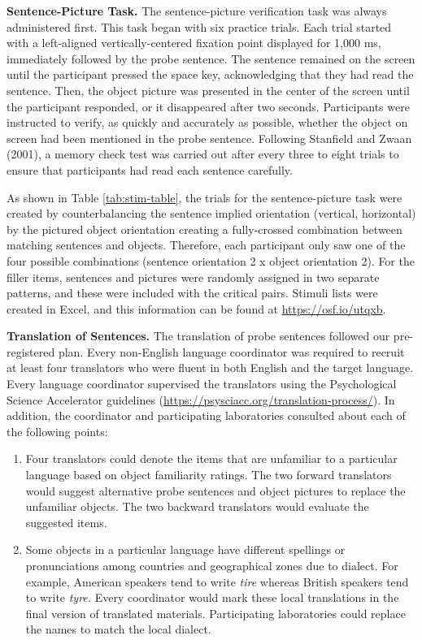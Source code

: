 \documentclass[
  man,floatsintext]{apa7}
\begin{document}
\textbf{Sentence-Picture Task.} The sentence-picture verification task was
always administered first. This task began with six practice trials.
Each trial started with a left-aligned vertically-centered fixation
point displayed for 1,000 ms, immediately followed by the probe
sentence. The sentence remained on the screen until the participant
pressed the space key, acknowledging that they had read the sentence.
Then, the object picture was
presented in the center of the screen until the participant responded,
or it disappeared after two seconds. Participants were instructed to
verify, as quickly and accurately as possible, whether the object on
screen had been mentioned in the probe sentence. Following
Stanfield and Zwaan (2001), a memory check test was carried out after every
three to eight trials to ensure that participants had read each sentence
carefully.

As shown in Table \ref{tab:stim-table}, the trials for the
sentence-picture task were created by counterbalancing the sentence
implied orientation (vertical, horizontal) by the pictured object
orientation creating a fully-crossed combination between matching
sentences and objects. Therefore, each participant only saw one of the
four possible combinations (sentence orientation 2 x object orientation
2). For the filler items, sentences and pictures were randomly assigned
in two separate patterns, and these were included with the critical
pairs. Stimuli lists were created in Excel, and this information can be
found at \url{https://osf.io/utqxb}.

\textbf{Translation of Sentences.} The translation of probe sentences
followed our pre-registered plan. Every non-English language coordinator
was required to recruit at least four translators who were fluent in
both English and the target language. Every language coordinator
supervised the translators using the Psychological Science Accelerator
guidelines (\url{https://psysciacc.org/translation-process/}). In addition,
the coordinator and participating laboratories consulted about each of
the following points:

\begin{enumerate}
\def\labelenumi{\arabic{enumi})}
\item
  Four translators could denote the items that are unfamiliar to a
  particular language based on object familiarity ratings. The two
  forward translators would suggest alternative probe sentences and
  object pictures to replace the unfamiliar objects. The two backward
  translators would evaluate the suggested items.
\item
  Some objects in a particular language have different spellings or
  pronunciations among countries and geographical zones due to
  dialect. For example, American speakers tend to write \emph{tire} whereas
  British speakers tend to write \emph{tyre.} Every coordinator would mark
  these local translations in the final version of translated
  materials. Participating laboratories could replace the names to
  match the local dialect.
\end{enumerate}
\end{document}
